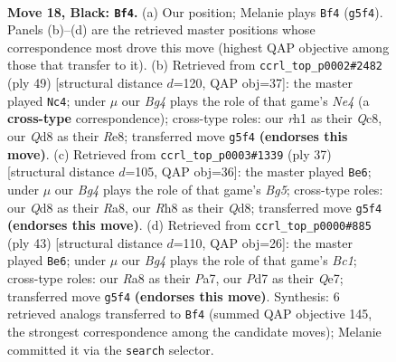 \documentclass[11pt]{article}
\begin{document}
\clearpage

\begin{figure}[p]\centering
\begin{subfigure}{0.46\textwidth}\centering
\resizebox{\linewidth}{!}{%
\newchessgame
\chessboard[
  setfen={r2q3r/3p1k1p/n2P4/2p1p1b1/P5P1/2N2N2/1P6/R2QK2R b KQ - 1 18},
  showmover=false,
  pgfstyle=straightmove, color=movearrow, markmove={g5-f4}
]}
\caption{}
\end{subfigure}\hfill
\begin{subfigure}{0.46\textwidth}\centering
\resizebox{\linewidth}{!}{%
\newchessgame
\chessboard[
  setfen={2q1rr1k/6pp/p2p4/1p1Rn1P1/7P/P3N1R1/1PP5/2KQ4 b - - 4 25},
  showmover=false,
  pgfstyle=straightmove, color=movearrow, markmove={e5-c4}
]}
\caption{}
\end{subfigure}
\\[4pt]
\begin{subfigure}{0.46\textwidth}\centering
\resizebox{\linewidth}{!}{%
\newchessgame
\chessboard[
  setfen={r2qr1k1/p4p1p/3P2p1/1p6/4R1b1/2N1Q3/PPP3PP/4K2R b K - 4 19},
  showmover=false,
  pgfstyle=straightmove, color=movearrow, markmove={g4-e6}
]}
\caption{}
\end{subfigure}\hfill
\begin{subfigure}{0.46\textwidth}\centering
\resizebox{\linewidth}{!}{%
\newchessgame
\chessboard[
  setfen={r1b2k2/pp2q2r/2pN1pR1/2n5/1bP2Q2/8/PP3P1P/2KR1B2 b - - 0 22},
  showmover=false,
  pgfstyle=straightmove, color=movearrow, markmove={c8-e6}
]}
\caption{}
\end{subfigure}
\caption{\textbf{Move 18, Black: \texttt{Bf4}.} (a) Our position; Melanie plays \texttt{Bf4} (\texttt{g5f4}). Panels (b)--(d) are the retrieved master positions whose correspondence most drove this move (highest QAP objective among those that transfer to it). (b) Retrieved from \texttt{ccrl\_top\_p0002\#2482} (ply 49) [structural distance $d$=120, QAP obj=37]: the master played \texttt{Nc4}; under $\mu$ our \emph{Bg4} plays the role of that game's \emph{Ne4} (a \textbf{cross-type} correspondence); cross-type roles: our \emph{r}h1 as their \emph{Q}c8, our \emph{Q}d8 as their \emph{R}e8; transferred move \texttt{g5f4} \textbf{(endorses this move)}. (c) Retrieved from \texttt{ccrl\_top\_p0003\#1339} (ply 37) [structural distance $d$=105, QAP obj=36]: the master played \texttt{Be6}; under $\mu$ our \emph{Bg4} plays the role of that game's \emph{Bg5}; cross-type roles: our \emph{Q}d8 as their \emph{R}a8, our \emph{R}h8 as their \emph{Q}d8; transferred move \texttt{g5f4} \textbf{(endorses this move)}. (d) Retrieved from \texttt{ccrl\_top\_p0000\#885} (ply 43) [structural distance $d$=110, QAP obj=26]: the master played \texttt{Be6}; under $\mu$ our \emph{Bg4} plays the role of that game's \emph{Bc1}; cross-type roles: our \emph{R}a8 as their \emph{P}a7, our \emph{P}d7 as their \emph{Q}e7; transferred move \texttt{g5f4} \textbf{(endorses this move)}. Synthesis: 6 retrieved analogs transferred to \texttt{Bf4} (summed QAP objective 145, the strongest correspondence among the candidate moves); Melanie committed it via the \texttt{search} selector.}
\label{fig:thought-m35}
\end{figure}
\end{document}
